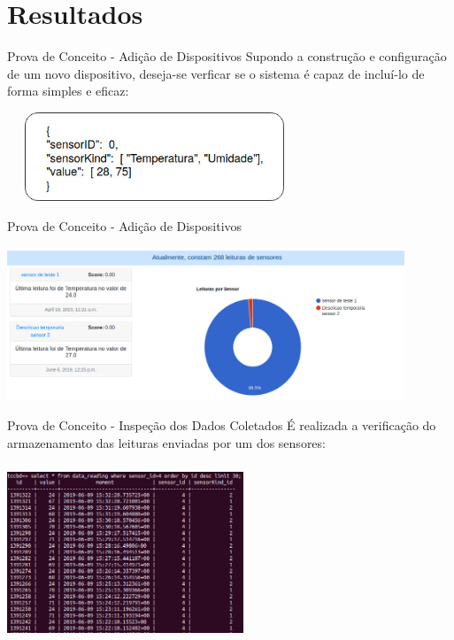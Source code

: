\documentclass{beamer}
\begin{document}
  \section{Resultados}

    \begin{frame}{ Prova de Conceito - Adição de Dispositivos}
      \quad Supondo a construção e configuração de um novo dispositivo, deseja-se verficar se o sistema é capaz de incluí-lo de forma simples e eficaz:
      \begin{center}
      \includegraphics[height=75pt, width=250pt]{mensagemJSONExemplo}
      \end{center}
    \end{frame}
    \begin{frame}{ Prova de Conceito - Adição de Dispositivos}
      \begin{center}
      \includegraphics[height=130pt, width=\textwidth]{prova2}
      \end{center}
    \end{frame}
    \begin{frame}{Prova de Conceito - Inspeção dos Dados Coletados}
      \quad É realizada a verificação do armazenamento das leituras enviadas por um dos sensores:
      \begin{center}
      \includegraphics[height=150pt, width=200pt]{prova4}
      \end{center}
    \end{frame}
\end{document}
